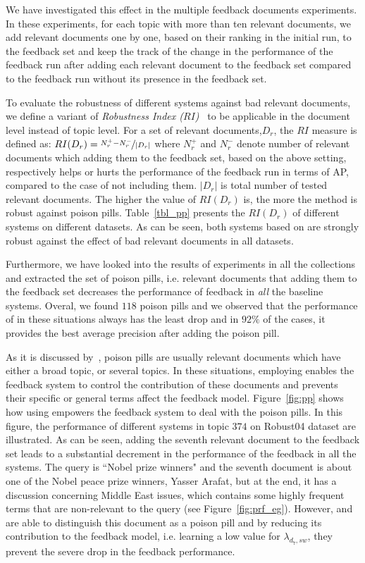 We have investigated this effect in the multiple feedback documents experiments. In these experiments, for each topic with more than ten relevant documents, we add relevant documents one by one, based on their ranking in the initial run, to the feedback set and keep the track of the change in the performance of the feedback run after adding each relevant document to the feedback set compared to the feedback run without its presence in the feedback set.  
%

%

To evaluate the robustness of different systems against bad relevant documents, we define a variant of \emph{Robustness Index ($RI$)}~\citep{Collins-Thompson:2007} to be applicable in the document level instead of topic level. For a set of
relevant documents,$D_r$, the $RI$ measure is defined as: $ RI(D_r)= \nicefrac{N_r^+ -  N_r^-}{|D_r|}$ where $N_r^+$ and $N_r^-$ denote number of relevant documents which adding them to the feedback set, based on the above setting, respectively helps or hurts the performance of the feedback run in terms of AP, compared to the case of not including them. $|D_r|$ is total number of tested relevant documents. The higher the value of $RI(D_r)$ is, the more the method is robust against poison pills. Table~\ref{tbl_pp} presents the $RI(D_r)$ of different systems on different datasets. As can be seen, both systems based on \swlms  are strongly robust against the effect of bad relevant documents in all datasets. 

Furthermore, we have looked into the results of experiments in all the collections and extracted the set of poison pills, i.e. relevant documents that adding them to the feedback set decreases the  performance of feedback in \emph{all} the baseline systems. 
Overal, we found $118$ poison pills and we observed that the performance of \acrswlm  in these situations always has the least drop and in $92\%$ of the cases, it provides the best average precision after adding the poison pill. 

As it is discussed by~\citet{Terra:2005}, poison pills are usually relevant documents which have either a broad topic, or several topics. In these situations, employing \swlms  enables the feedback system to control the contribution of these documents and prevents their specific or general terms affect the feedback model. Figure~\ref{fig:pp} shows how using \swlm  empowers the feedback system to deal with the poison pills. In this figure, the performance of different systems in topic $374$ on Robust04 dataset are illustrated. As can be seen, adding the seventh relevant document to the feedback set leads to a substantial decrement in the performance of the feedback in all the systems. The query is ``Nobel prize winners" and the seventh document is about one of the Nobel peace prize winners, Yasser Arafat, but at the end, it has a discussion concerning Middle East issues, which contains some highly frequent terms that are non-relevant to the query (see Figure~\ref{fig:prf_eg}).  
However, \acrswlm  and \acswlm  are able to distinguish this document as a poison pill and by reducing its contribution to the feedback model, i.e. learning a low value for $\lambda_{d_7,sw}$, they prevent the severe drop in the feedback performance. 

